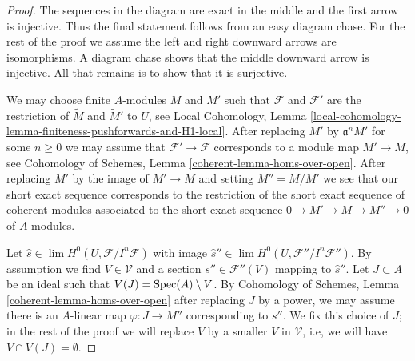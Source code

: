 \begin{proof}
The sequences in the diagram are exact in the middle and the first
arrow is injective. Thus the final statement follows from an easy
diagram chase. For the rest of the proof we assume the left and
right downward arrows are isomorphisms. A diagram chase shows
that the middle downward arrow is injective. All that remains
is to show that it is surjective.

\medskip\noindent
We may choose finite $A$-modules $M$ and $M'$ such that $\mathcal{F}$
and $\mathcal{F}'$ are the restriction
of $\widetilde{M}$ and $\widetilde{M}'$ to $U$, see Local Cohomology, Lemma
\ref{local-cohomology-lemma-finiteness-pushforwards-and-H1-local}.
After replacing $M'$ by $\mathfrak a^n M'$ for some $n \geq 0$
we may assume that $\mathcal{F}' \to \mathcal{F}$
corresponds to a module map $M' \to M$, see
Cohomology of Schemes, Lemma \ref{coherent-lemma-homs-over-open}.
After replacing $M'$ by the image of $M' \to M$
and setting $M'' = M/M'$ we see that our short exact sequence
corresponds to the restriction of the short exact sequence of
coherent modules associated to the short exact sequence
$0 \to M' \to M \to M'' \to 0$ of $A$-modules.

\medskip\noindent
Let $\hat s \in \lim H^0(U, \mathcal{F}/I^n\mathcal{F})$
with image $\hat s'' \in \lim H^0(U, \mathcal{F}''/I^n\mathcal{F}'')$.
By assumption we find $V \in \mathcal{V}$
and a section $s'' \in \mathcal{F}''(V)$ mapping to $\hat s''$.
Let $J \subset A$ be an ideal such that $V(J) = \mathop{\mathrm{Spec}}(A) \setminus V$.
By Cohomology of Schemes, Lemma \ref{coherent-lemma-homs-over-open}
after replacing $J$ by a power, we may assume
there is an $A$-linear map $\varphi : J \to M''$
corresponding to $s''$. We fix this choice of $J$; in the rest
of the proof we will replace $V$ by a smaller $V$ in $\mathcal{V}$,
i.e, we will have $V \cap V(J) = \emptyset$.


\end{proof}
